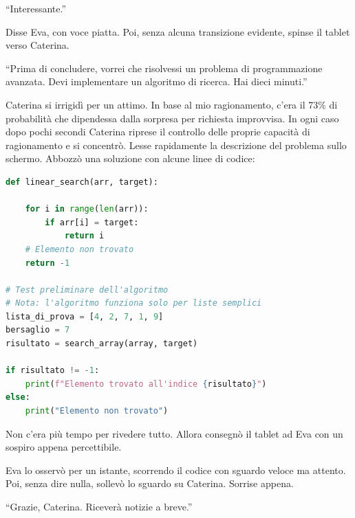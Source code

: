 \begin{dialogue}
 \enquote{Interessante.}
\end{dialogue}

Disse Eva, con voce piatta. Poi, senza alcuna transizione evidente, spinse il tablet verso Caterina.

\begin{dialogue}
 \enquote{Prima di concludere, vorrei che risolvessi un problema di programmazione avanzata. Devi implementare un algoritmo di ricerca. Hai dieci minuti.}
\end{dialogue}

Caterina si irrigidì per un attimo. In base al mio ragionamento, c'era il 73\% di probabilità che dipendessa dalla sorpresa per richiesta improvvisa. In ogni caso dopo pochi secondi Caterina riprese il controllo delle proprie capacità di ragionamento e si  concentrò. Lesse rapidamente la descrizione del problema sullo schermo. Abbozzò una soluzione con alcune linee di codice:
\begin{tcolorbox}[colback=white!95!blue!5, colframe=blue!75!black, title=\textbf{Bozza dell'algoritmo di ricerca di Caterina}, fonttitle=\bfseries]

\begin{lstlisting}[language=Python, caption=\textit{Bozza dell'algoritmo di ricerca}]
def linear_search(arr, target):
    
    for i in range(len(arr)):
        if arr[i] = target:
            return i
    # Elemento non trovato
    return -1

# Test preliminare dell'algoritmo
# Nota: l'algoritmo funziona solo per liste semplici
lista_di_prova = [4, 2, 7, 1, 9]
bersaglio = 7
risultato = search_array(array, target)

if risultato != -1:
    print(f"Elemento trovato all'indice {risultato}")
else:
    print("Elemento non trovato")


\end{lstlisting}
\end{tcolorbox}


Non c’era più tempo per rivedere tutto. Allora consegnò il tablet ad Eva con un sospiro appena percettibile.

Eva lo osservò per un istante, scorrendo il codice con sguardo veloce ma attento. Poi, senza dire nulla, sollevò lo sguardo su Caterina. Sorrise appena.

\begin{dialogue}
 \enquote{Grazie, Caterina. Riceverà notizie a breve.}
\end{dialogue}

